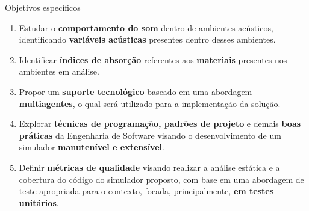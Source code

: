 \begin{frame}[allowframebreaks]{Objetivos específicos}

\begin{enumerate}
\item Estudar o \textbf{comportamento do som} dentro de ambientes acústicos, identificando \textbf{variáveis acústicas} presentes dentro desses ambientes.

\bigskip 

\item Identificar \textbf{índices de absorção} referentes aos \textbf{materiais} presentes nos ambientes em análise.

\bigskip 

\item Propor um \textbf{suporte tecnológico} baseado em uma abordagem \textbf{multiagentes}, o qual será utilizado para a implementação da solução.

\bigskip 

\item Explorar \textbf{técnicas de programação, padrões de projeto} e demais \textbf{boas práticas} da Engenharia de Software visando o desenvolvimento de um simulador \textbf{manutenível e extensível}.

\bigskip 

\item Definir \textbf{métricas de qualidade} visando realizar a análise estática e a cobertura do código do simulador proposto, com base em uma abordagem de teste apropriada para o contexto, focada, principalmente, \textbf{em testes unitários}.
\end{enumerate}

\end{frame}